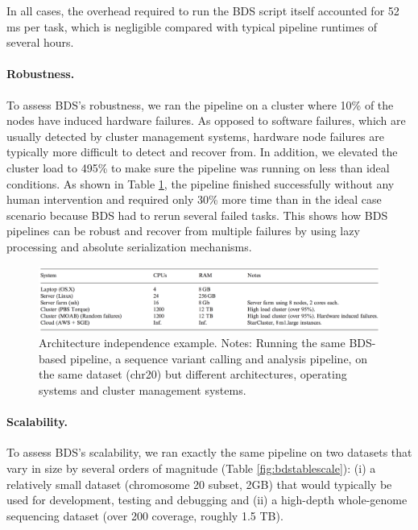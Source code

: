 In all cases, the overhead required to run the BDS script itself accounted for 52 ms per task, which is negligible compared with typical pipeline runtimes of several hours.

\paragraph{Robustness.} To assess BDS’s robustness, we ran the pipeline on a cluster where 10\% of the nodes have induced hardware failures. As opposed to software failures, which are usually detected by cluster management systems, hardware node failures are typically more difficult to detect and recover from. In addition, we elevated the cluster load to 495\% to make sure the pipeline was running on less than ideal conditions. As shown in Table \ref{fig:bdstablearch}, the pipeline finished successfully without any human intervention and required only 30\% more time than in the ideal case scenario because BDS had to rerun several failed tasks. This shows how BDS pipelines can be robust and recover from multiple failures by using lazy processing and absolute serialization mechanisms.

\begin{figure}
    \centering
    \includegraphics[width=14cm]{bds_table_1.png}
    \caption{Architecture independence example. Notes: Running the same BDS-based pipeline, a sequence variant calling and analysis pipeline, on the same dataset (chr20) but different architectures, operating systems and cluster management systems.}
    \label{fig:bdstablearch}
\end{figure}

\paragraph{Scalability.} To assess BDS’s scalability, we ran exactly the same pipeline on two datasets that vary in size by several orders of magnitude (Table \ref{fig:bdstablescale}): (i) a relatively small dataset (chromosome 20 subset, 2GB) that would typically be used for development, testing and debugging and (ii) a high-depth whole-genome sequencing dataset (over 200 coverage, roughly 1.5 TB).
 
